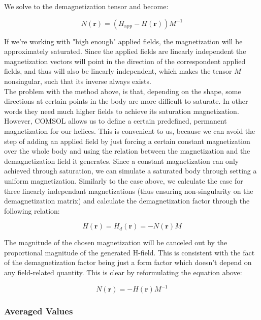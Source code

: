 We solve to the demagnetization tensor and become:

\begin{equation}
N(\textbf{r}) = ( H_\text{app}-H(\textbf{r}) )M^{-1}
\end{equation}

If we're working with "high enough" applied fields, the magnetization will be approximately saturated. Since the applied fields are linearly independent the magnetization vectors will point in the direction of the correspondent applied fields, and thus will also be linearly independent, which makes the tensor $M$ nonsingular, such that its inverse always exists.\\

The problem with the method above, is that, depending on the shape, some directions at certain points in the body are more difficult to saturate. In other words they need much higher fields to achieve its saturation magnetization. However, COMSOL allows us to define a certain predefined, permanent magnetization for our helices. This is convenient to us, because we can avoid the step of adding an applied field by just forcing a certain constant magnetization over the whole body and using the relation between the magnetization and the demagnetization field it generates. Since a constant magnetization can only achieved through saturation, we can simulate a saturated body through setting a uniform magnetization. Similarly to the case above, we calculate the case for three linearly independant magnetizations (thus ensuring non-singularity on the demagnetization matrix) and calculate the demagnetization factor through the following relation:

\begin{equation}
H(\textbf{r}) = H_d(\textbf{r}) =  -N(\textbf{r})M
\end{equation}

The magnitude of the chosen magnetization will be canceled out by the proportional magnitude of the generated H-field. This is consistent with the fact of the demagnetization factor being just a form factor which doesn't depend on any field-related quantity. This is clear by reformulating the equation above:

\begin{equation}
N(\textbf{r}) = -H(\textbf{r})M^{-1}
\end{equation}

\subsubsection{Averaged Values}

